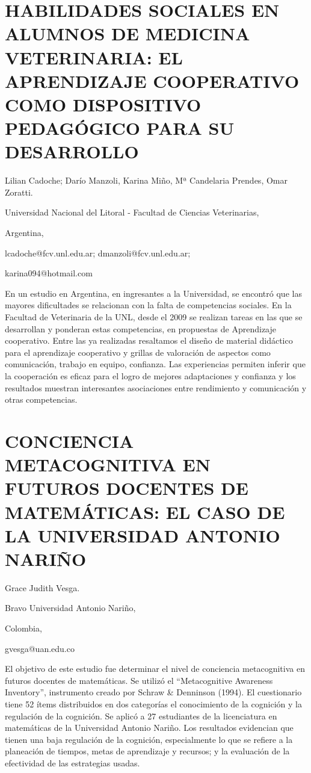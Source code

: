\section{HABILIDADES SOCIALES EN ALUMNOS DE MEDICINA VETERINARIA: EL APRENDIZAJE
COOPERATIVO COMO DISPOSITIVO PEDAGÓGICO PARA SU DESARROLLO}

\begin{datos}

Lilian Cadoche; Darío Manzoli, Karina Miño, Mª Candelaria Prendes,
Omar Zoratti.

Universidad Nacional del Litoral - Facultad de Ciencias Veterinarias,

Argentina,

lcadoche@fcv.unl.edu.ar; dmanzoli@fcv.unl.edu.ar;

karina094@hotmail.com

\end{datos}

En un estudio en Argentina, en ingresantes a la Universidad, se encontró
que las mayores dificultades se relacionan con la falta de competencias
sociales. En la Facultad de Veterinaria de la UNL, desde el 2009 se
realizan tareas en las que se desarrollan y ponderan estas competencias,
en propuestas de Aprendizaje cooperativo. Entre las ya realizadas
resaltamos el diseño de material didáctico para el aprendizaje cooperativo
y grillas de valoración de aspectos como comunicación, trabajo en
equipo, confianza. Las experiencias permiten inferir que la cooperación
es eficaz para el logro de mejores adaptaciones y confianza y los
resultados muestran interesantes asociaciones entre rendimiento y
comunicación y otras competencias.


\section{CONCIENCIA METACOGNITIVA EN FUTUROS DOCENTES DE MATEMÁTICAS: EL CASO
DE LA UNIVERSIDAD ANTONIO NARIÑO}

\begin{datos}

Grace Judith Vesga.

Bravo Universidad Antonio Nariño, 

Colombia,

gvesga@uan.edu.co 

\end{datos}

El objetivo de este estudio fue determinar el nivel de conciencia
metacognitiva en futuros docentes de matemáticas. Se utilizó el “Metacognitive
Awareness Inventory”, instrumento creado por Schraw \& Denninson (1994).
El cuestionario tiene 52 ítems distribuidos en dos categorías el conocimiento
de la cognición y la regulación de la cognición. Se aplicó a 27 estudiantes
de la licenciatura en matemáticas de la Universidad Antonio Nariño.
Los resultados evidencian que tienen una baja regulación de la cognición,
especialmente lo que se refiere a la planeación de tiempos, metas
de aprendizaje y recursos; y la evaluación de la efectividad de las
estrategias usadas. 


